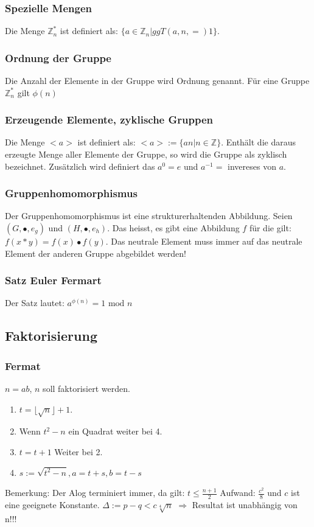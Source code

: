 \documentclass[10pt]{article}
\newcommand{\ZN}{\mathbb{Z}} %
\newcommand{\T}[1]{\text{#1}} %
\newcommand{\Ra}{\Rightarrow}
\begin{document}
\subsubsection{Spezielle Mengen}
Die Menge $\ZN^*_n$ ist definiert als: $\{a \in \ZN_n|ggT(a,n,=)1\}$.
\subsubsection{Ordnung der Gruppe}
Die Anzahl der Elemente in der Gruppe wird Ordnung genannt. Für eine Gruppe $\ZN^*_n$ gilt $\phi(n)$
\subsubsection{Erzeugende Elemente, zyklische Gruppen}
Die Menge $<a>$ ist definiert als: $<a>:= \{an|n \in \ZN\}$. Enthält die daraus erzeugte Menge aller Elemente der Gruppe, so wird die Gruppe als zyklisch bezeichnet. Zusätzlich wird definiert das $a^0 = e$ und $a^{-1} =$ invereses von $a$.
\subsubsection{Gruppenhomomorphismus}
Der Gruppenhomomorphismus ist eine strukturerhaltenden Abbildung. Seien $(G,\bullet,e_g)$ und $(H,\bullet,e_h)$. Das heisst, es gibt eine Abbildung $f$ für die gilt: $f(x*y) = f(x) \bullet f(y)$. Das neutrale Element muss immer auf das neutrale Element der anderen Gruppe abgebildet werden!
\subsubsection{Satz Euler Fermart}
Der Satz lautet: $a^{\phi(n)} = 1\T{ mod }n$
\subsection{Faktorisierung}
\subsubsection{Fermat}
$n=ab$, $n$ soll faktorisiert werden. 
\begin{enumerate}
\item $t = \lfloor \sqrt n \rfloor + 1$. 
\item Wenn $t^2 - n$ ein Quadrat weiter bei 4.
\item $t = t + 1$ Weiter bei 2.
\item $s := \sqrt{t^2 -n}, a = t + s, b = t - s$
\end{enumerate}
Bemerkung: Der Alog terminiert immer, da gilt: $t \le \frac{n+1}{2}$
Aufwand: $\frac{c^2}{8}$ und $c$ ist eine geeignete Konstante. $\Delta := p-q < c \sqrt[4]{n}$ {\color{red} $\Ra$ Resultat ist unabhängig von n!!!} 
\end{document}
